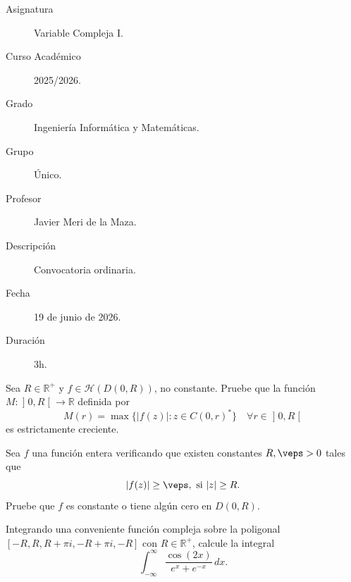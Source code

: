 \documentclass[12pt]{article}
\begin{document}

    

    \begin{description}
        \item[Asignatura] Variable Compleja I.
        \item[Curso Académico] 2025/2026.
        \item[Grado] Ingeniería Informática y Matemáticas.
        \item[Grupo] Único.
        \item[Profesor] Javier Meri de la Maza.
        \item[Descripción] Convocatoria ordinaria.
        \item[Fecha] 19 de junio de 2026.
        \item[Duración] 3h.
    \end{description}
    \newpage

    
    \begin{ejercicio}[1.5 puntos]
        Sea $R \in \mathbb{R}^+$ y $f \in \mathcal{H}(D(0, R))$, no constante. Pruebe que la función $M \colon \mathopen{]}0, R\mathclose{[} \longrightarrow \mathbb{R}$ definida por
        \[ M(r) = \max \{|f(z)| : z \in C(0, r)^*\} \quad \forall r \in \mathopen{]}0, R\mathclose{[} \]
        es estrictamente creciente.
    \end{ejercicio}

    \begin{ejercicio}[2 puntos]
        Sea $f$ una función entera verificando que existen constantes $R, \veps > 0$ tales que
        \[ |f(z)| \ge \veps, \text{ si } |z| \ge R. \]
        Pruebe que $f$ es constante o tiene algún cero en $D(0, R)$.
    \end{ejercicio}

    \begin{ejercicio}[2.5 puntos]
        Integrando una conveniente función compleja sobre la poligonal $[-R, R, R + \pi i, -R + \pi i, -R]$ con $R \in \mathbb{R}^+$, calcule la integral
        \[ \int_{-\infty}^{\infty} \frac{\cos(2x)}{e^x + e^{-x}} \, dx. \]
    \end{ejercicio}
\end{document}
